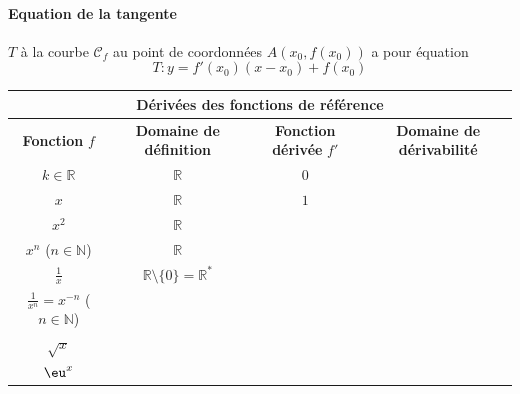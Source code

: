 \documentclass[main.tex]{subfiles}
\begin{document}
\paragraph{Equation de la tangente}	 $T$ à la courbe $\mathscr{C}_f$ au point de coordonnées $A(x_0,f(x_0))$ a pour équation 
	\setlength{\abovedisplayskip}{3pt}
	\setlength{\belowdisplayskip}{3pt}  
	$$T\colon y= f'(x_0)(x-x_0)+f(x_0)$$ 
\begin{center}
	\renewcommand{\arraystretch}{1.8}
	\begin{tabular}{|c|c||c|c|}
		\hline 
		\multicolumn{4}{|c|}{\textbf{Dérivées des fonctions de référence} }\\
		\hline
		\textbf{Fonction} $f$ & \textbf{Domaine de définition} & \textbf{Fonction dérivée} $f'$ & \textbf{Domaine de dérivabilité}\\
		\hline
		$k \in \mathbb{R}$ & $\mathbb{R}$ & 0 &\phantom{$\mathbb{R}$}\\
		\hline
		$x$ & $\mathbb{R}$ & $1$&\phantom{$\mathbb{R}$} \\
		\hline
		$x^2$ & $\mathbb{R}$& \phantom{$2x$}  & \phantom{$\mathbb{R}$} \\
		\hline
		$x^n$ ($n\in \mathbb{N}$)&$\mathbb{R}$ & \phantom{$nx^{n-1}$} & \phantom{$\mathbb{R}$} \\ 
		\hline
		$\displaystyle\frac{1}{x}$ &$\mathbb{R}\setminus\{0\} = \mathbb{R}^{*}$  & \phantom{$-\displaystyle\frac{1}{x^2}$} & \phantom{$\mathbb{R}^{*}$} \\
		\hline
		$\frac{1}{x^n}=x^{-n}$ ($n\in \mathbb{N}$)&\phantom{$\mathbb{R}^{*}$} & \phantom{$-nx^{-n-1}$} & \phantom{$\mathbb{R}^{*}$} \\
		\hline
		$\sqrt{x}$ & \phantom{$\left[0; +\infty \right[ = \mathbb{R}_{+}$}& \phantom{$\displaystyle\frac{1}{2\sqrt{x}}$}& \phantom{$]0,+\infty[ = \mathbb{R}^{*}_{+}$}\\
		\hline
		$\eu^x$& \phantom{$\mathbb{R}$}& \phantom{$\eu^x$} & \phantom{$\mathbb{R}$}\\
		\hline
	\end{tabular}
	

\end{center}
\end{document}
